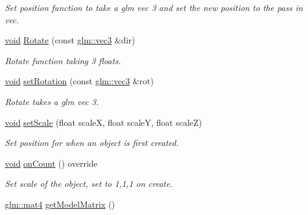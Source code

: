\begin{DoxyCompactItemize}
\begin{DoxyCompactList}\small\item\em Set position function to take a glm vec 3 and set the new position to the pass in vec. \end{DoxyCompactList}\item 
\mbox{\hyperlink{_s_d_l__opengles2__gl2ext_8h_ae5d8fa23ad07c48bb609509eae494c95}{void}} \mbox{\hyperlink{class_aspect_1_1_engine_1_1_transform_a002e393cc28fde31c5899e566876c762}{Rotate}} (const \mbox{\hyperlink{group__core__types_ga1c47e8b3386109bc992b6c48e91b0be7}{glm\+::vec3}} \&dir)
\begin{DoxyCompactList}\small\item\em Rotate function taking 3 floats. \end{DoxyCompactList}\item 
\mbox{\hyperlink{_s_d_l__opengles2__gl2ext_8h_ae5d8fa23ad07c48bb609509eae494c95}{void}} \mbox{\hyperlink{class_aspect_1_1_engine_1_1_transform_afdb7357a3b7b7306151764443a92e38b}{set\+Rotation}} (const \mbox{\hyperlink{group__core__types_ga1c47e8b3386109bc992b6c48e91b0be7}{glm\+::vec3}} \&rot)
\begin{DoxyCompactList}\small\item\em Rotate takes a glm vec 3. \end{DoxyCompactList}\item 
\mbox{\hyperlink{_s_d_l__opengles2__gl2ext_8h_ae5d8fa23ad07c48bb609509eae494c95}{void}} \mbox{\hyperlink{class_aspect_1_1_engine_1_1_transform_a5c5737047cae0a4c0c6972171f32c2c4}{set\+Scale}} (float scaleX, float scaleY, float scaleZ)
\begin{DoxyCompactList}\small\item\em Set position for when an object is first created. \end{DoxyCompactList}\item 
\mbox{\hyperlink{_s_d_l__opengles2__gl2ext_8h_ae5d8fa23ad07c48bb609509eae494c95}{void}} \mbox{\hyperlink{class_aspect_1_1_engine_1_1_transform_acb53a815498eea17774cc42cfa6c03bd}{on\+Count}} () override
\begin{DoxyCompactList}\small\item\em Set scale of the object, set to 1,1,1 on create. \end{DoxyCompactList}\item 
\mbox{\hyperlink{group__core__types_ga7dcd2365c2e368e6af5b7adeb6a9c8df}{glm\+::mat4}} \mbox{\hyperlink{class_aspect_1_1_engine_1_1_transform_a518b259100172bc76833d9f5580bfa11}{get\+Model\+Matrix}} ()
\item 

\end{DoxyCompactItemize}
